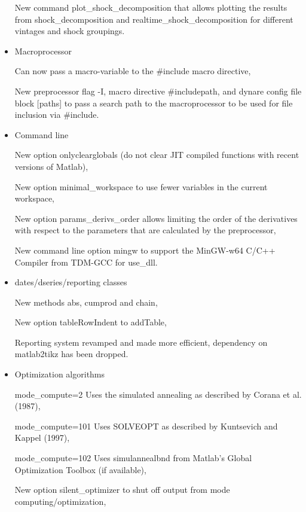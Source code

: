 \documentclass[cn,10pt,math=newtx,citestyle=gb7714-2015,bibstyle=gb7714-2015]{elegantbook}
\begin{document}
\begin{itemize}
		
		New command plot\_shock\_decomposition that allows plotting the results from shock\_decomposition and realtime\_shock\_decomposition for different vintages and shock groupings.
		
		
		
		
		\item Macroprocessor
		
		
		Can now pass a macro-variable to the \@\#include macro directive,
		
		
		New preprocessor flag -I, macro directive \@\#includepath, and dynare config file block [paths] to pass a search path to the macroprocessor to be used for file inclusion via \@\#include.
		
		
		
		
		\item Command line
		
		
		New option onlyclearglobals (do not clear JIT compiled functions with recent versions of Matlab),
		
		
		New option minimal\_workspace to use fewer variables in the current workspace,
		
		
		New option params\_derivs\_order allows limiting the order of the derivatives with respect to the parameters that are calculated by the preprocessor,
		
		
		New command line option mingw to support the MinGW-w64 C/C++ Compiler from TDM-GCC for use\_dll.
		
		
		
		
		\item dates/dseries/reporting classes
		
		
		New methods abs, cumprod and chain,
		
		
		New option tableRowIndent to addTable,
		
		
		Reporting system revamped and made more efficient, dependency on matlab2tikz has been dropped.
		
		
		
		
		\item Optimization algorithms
		
		
		mode\_compute=2 Uses the simulated annealing as described by Corana et al. (1987),
		
		
		mode\_compute=101 Uses SOLVEOPT as described by Kuntsevich and Kappel (1997),
		
		
		mode\_compute=102 Uses simulannealbnd from Matlab's Global Optimization Toolbox (if available),
		
		
		New option silent\_optimizer to shut off output from mode computing/optimization,
		

\end{itemize}
\end{document}
